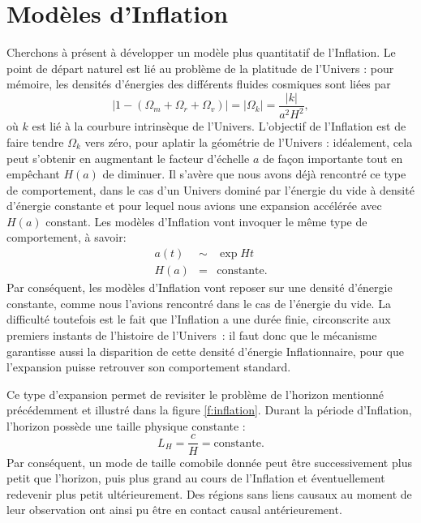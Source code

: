 \section{Modèles d'Inflation}
Cherchons à présent à développer un modèle plus quantitatif de l'Inflation. Le point de départ naturel est lié au problème de la platitude de l'Univers : pour mémoire, les densités d'énergies des différents fluides cosmiques sont liées par 
\begin{equation}
|1-(\Omega_m+\Omega_r+\Omega_v)|=|\Omega_k|=\frac{|k|}{a^2H^2},
\end{equation}
où $k$ est lié à la courbure intrinsèque de l'Univers. L'objectif de l'Inflation est de faire tendre $\Omega_k$ vers zéro, pour aplatir la géométrie de l'Univers : idéalement, cela peut s'obtenir en augmentant le facteur d'échelle $a$ de façon importante tout en empêchant $H(a)$ de diminuer. Il s'avère que nous avons déjà rencontré ce type de comportement, dans le cas d'un Univers dominé par l'énergie du vide à densité d'énergie constante et pour lequel nous avions une expansion accélérée avec $H(a)$ constant. Les modèles d'Inflation vont invoquer le même type de comportement, à savoir:
\begin{eqnarray}
a(t)&\sim&\exp{Ht}\\
H(a)&=&\mathrm{constante}.
\end{eqnarray} 
Par conséquent, les modèles d'Inflation vont reposer sur une densité d'énergie constante, comme nous l'avions rencontré dans le cas de l'énergie du vide. La difficulté toutefois est le fait que l'Inflation a une durée finie, circonscrite aux premiers instants de l'histoire de l'Univers~: il faut donc que le mécanisme garantisse aussi la disparition de cette densité d'énergie Inflationnaire, pour que l'expansion puisse retrouver son comportement standard.

Ce type d'expansion permet de revisiter le problème de l'horizon mentionné précédemment et illustré dans la figure \ref{f:inflation}. Durant la période d'Inflation, l'horizon possède une taille physique constante :
\begin{equation}
L_H=\frac{c}{H}=\mathrm{constante}.
\end{equation}
Par conséquent, un mode de taille comobile donnée peut être successivement plus petit que l'horizon, puis plus grand au cours de l'Inflation et éventuellement redevenir plus petit ultérieurement. Des régions sans liens causaux au moment de leur observation ont ainsi pu être en contact causal antérieurement.


